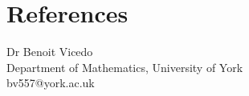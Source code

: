 \documentclass[10pt]{article}
\begin{document}
\section*{References}
\begin{minipage}[ht]{0.48\textwidth}
Dr Benoit Vicedo \\
Department of Mathematics, University of York \\
bv557@york.ac.uk
\end{minipage}
\end{document}
